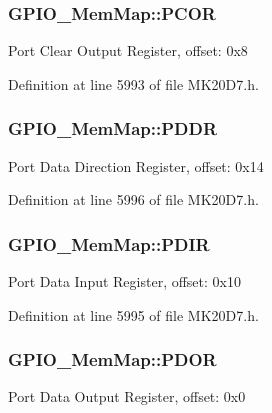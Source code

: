 \subsubsection[{\texorpdfstring{P\+C\+OR}{PCOR}}]{ G\+P\+I\+O\+\_\+\+Mem\+Map\+::\+P\+C\+OR}\hypertarget{struct_g_p_i_o___mem_map_a996f6a159415a5c0d0683346e950e7fb}{}\label{struct_g_p_i_o___mem_map_a996f6a159415a5c0d0683346e950e7fb}
Port Clear Output Register, offset\+: 0x8 

Definition at line 5993 of file M\+K20\+D7.\+h.

\subsubsection[{\texorpdfstring{P\+D\+DR}{PDDR}}]{ G\+P\+I\+O\+\_\+\+Mem\+Map\+::\+P\+D\+DR}\hypertarget{struct_g_p_i_o___mem_map_a49dfaa95d08fa9178dd7f098c87f562d}{}\label{struct_g_p_i_o___mem_map_a49dfaa95d08fa9178dd7f098c87f562d}
Port Data Direction Register, offset\+: 0x14 

Definition at line 5996 of file M\+K20\+D7.\+h.

\subsubsection[{\texorpdfstring{P\+D\+IR}{PDIR}}]{ G\+P\+I\+O\+\_\+\+Mem\+Map\+::\+P\+D\+IR}\hypertarget{struct_g_p_i_o___mem_map_a01933bea5d005bf126ea2e0345518763}{}\label{struct_g_p_i_o___mem_map_a01933bea5d005bf126ea2e0345518763}
Port Data Input Register, offset\+: 0x10 

Definition at line 5995 of file M\+K20\+D7.\+h.

\subsubsection[{\texorpdfstring{P\+D\+OR}{PDOR}}]{ G\+P\+I\+O\+\_\+\+Mem\+Map\+::\+P\+D\+OR}\hypertarget{struct_g_p_i_o___mem_map_aaf4f486952b9b4680e270ce6266122fd}{}\label{struct_g_p_i_o___mem_map_aaf4f486952b9b4680e270ce6266122fd}
Port Data Output Register, offset\+: 0x0 

